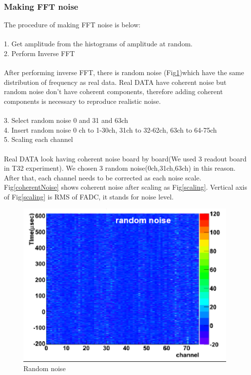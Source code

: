 \subsubsection{Making FFT noise}
 The procedure of making FFT noise is below:\\
\\
1. Get amplitude from the histograms of amplitude at random.\\
2. Perform Inverse FFT\\
\\
After performing inverse FFT, there is random noise (Fig\ref{randomNoise})which have the same distribution of frequency as real data. Real DATA have coherent noise but random noise don't have coherent components, therefore adding coherent components is necessary to reproduce realistic noise.\\
\\
3. Select random noise 0 and 31 and 63ch\\
4. Insert random noise 0 ch to 1-30ch, 31ch to 32-62ch, 63ch to 64-75ch\\
5. Scaling each channel \\
\\
Real DATA look having coherent noise board by board(We used 3 readout board in T32 experiment). We chosen 3 random noise(0ch,31ch,63ch) in this reason. After that, each channel needs to be corrected as each noise scale. Fig\ref{coherentNoise} shows coherent noise after scaling as Fig\ref{scaling}. Vertical axis of Fig\ref{scaling} is RMS of FADC, it stands for noise level.\\
\begin{figure}[!htb]
  \centering
  \centering
  \includegraphics[width=11cm,clip]{./fig/randomnoise.eps}
  \caption{Random noise}
  \label{randomNoise}
\end{figure}
